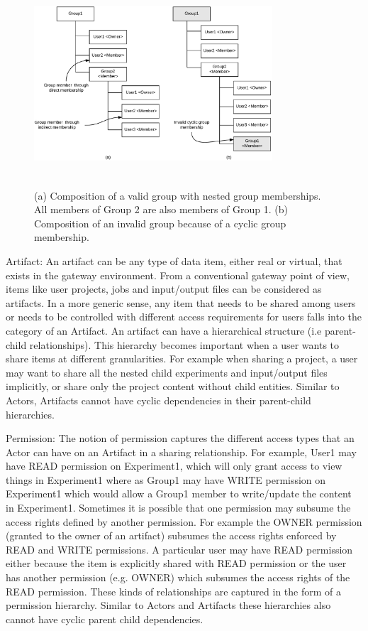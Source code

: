 \documentclass[sigconf]{acmart}
\begin{document}
\begin{figure}
\includegraphics[height=3in, width=3.5in]{figures/group-composition.pdf}
\caption{(a) Composition of a valid group with nested group memberships. All members of Group 2 are also members of Group 1. (b) Composition of an invalid group because of a cyclic group membership.}
\end{figure}

Artifact: An artifact can be any type of data item, either real or virtual, that exists in the gateway environment.	From a conventional gateway point of view, items like user projects, jobs and input/output files can be considered as artifacts. In a more generic sense, any item that needs to be shared among users or needs to be controlled with different access requirements for users falls into the category of an Artifact. An artifact can have a hierarchical structure (i.e parent-child relationships). This hierarchy becomes important when a user wants to share items at different granularities. For example when sharing a project, a user may want to share all the nested child experiments and input/output files implicitly, or share only the project content without child entities. Similar to Actors, Artifacts cannot have cyclic dependencies in their parent-child hierarchies.

Permission: The notion of permission captures the different access types that an Actor can have on an Artifact in a sharing relationship. For example, User1 may have READ permission on Experiment1, which will only grant access to view things in Experiment1 where as Group1 may have WRITE permission on Experiment1 which would allow a Group1 member to write/update the content in Experiment1. Sometimes it is possible that one permission may subsume the access rights defined by another permission. For example the OWNER permission (granted to the owner of an artifact) subsumes the access rights enforced by READ and WRITE permissions. A particular user may have READ permission either because the item is explicitly shared with READ permission or the user has another permission (e.g. OWNER) which subsumes the access rights of the READ permission. These kinds of relationships are captured in the form of a permission hierarchy. Similar to Actors and Artifacts these hierarchies also cannot have cyclic parent child dependencies.
\end{document}

